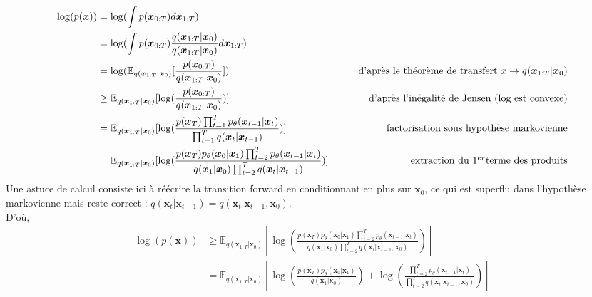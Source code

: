 \documentclass{article}
\begin{document}
\begin{align*}
\log(p(\boldsymbol{x})) &= \log(\int{p(\boldsymbol{x}_{0:T})d\boldsymbol{x}_{1:T}}) \\
&= \log(\int{p(\boldsymbol{x}_{0:T}) \frac{q(\boldsymbol{x}_{1:T}|\boldsymbol{x}_{0})}{q(\boldsymbol{x}_{1:T}|\boldsymbol{x}_{0})} d\boldsymbol{x}_{1:T}}) \\
&= \log(\mathbb{E}_{q(\boldsymbol{x}_{1:T}|\boldsymbol{x}_{0})}[\frac{p(\boldsymbol{x}_{0:T})}{q(\boldsymbol{x}_{1:T}|\boldsymbol{x}_{0})}]) & \tag*{d'après le théorème de transfert $x \rightarrow q(\boldsymbol{x}_{1:T}|\boldsymbol{x}_{0})$}\\
&\geq \mathbb{E}_{q(\boldsymbol{x}_{1:T}|\boldsymbol{x}_{0})}[\log(\frac{p(\boldsymbol{x}_{0:T})}{q(\boldsymbol{x}_{1:T}|\boldsymbol{x}_{0})})] & \tag*{d'après l'inégalité de Jensen (log est convexe)}\\
&= \mathbb{E}_{q(\boldsymbol{x}_{1:T}|\boldsymbol{x}_{0})}[\log(\frac{p(\boldsymbol{x}_T) \prod_{t=1}^T p_{\theta}(\boldsymbol{x}_{t-1}|\boldsymbol{x}_t)}{\prod_{t=1}^T q(\boldsymbol{x}_t|\boldsymbol{x}_{t-1})})] &\tag*{factorisation sous hypothèse markovienne} \\
&= \mathbb{E}_{q(\boldsymbol{x}_{1:T}|\boldsymbol{x}_{0})}[\log(\frac{p(\boldsymbol{x}_T)p_{\theta}(\boldsymbol{x}_0|\boldsymbol{x}_1) \prod_{t=2}^T p_{\theta}(\boldsymbol{x}_{t-1}|\boldsymbol{x}_t)}{q(\boldsymbol{x}_1|\boldsymbol{x}_0) \prod_{t=2}^{T} q(\boldsymbol{x}_t|\boldsymbol{x}_{t-1})})] & \tag*{extraction du 1$^{er}$terme des produits}
\end{align*}
Une astuce de calcul consiste ici à réécrire la transition forward en conditionnant en plus sur $\boldsymbol{x}_0$, ce qui est superflu dans l'hypothèse markovienne mais reste correct : $ q(\boldsymbol{x}_t|\boldsymbol{x}_{t-1}) = q(\boldsymbol{x}_t|\boldsymbol{x}_{t-1}, \boldsymbol{x}_0)$.\\
D'où, 
\begin{align*}
\log(p(\boldsymbol{x})) &\geq \mathbb{E}_{q(\boldsymbol{x}_{1:T}|\boldsymbol{x}_{0})}[\log(\frac{p(\boldsymbol{x}_T)p_{\theta}(\boldsymbol{x}_0|\boldsymbol{x}_1) \prod_{t=2}^T p_{\theta}(\boldsymbol{x}_{t-1}|\boldsymbol{x}_t)}{q(\boldsymbol{x}_1|\boldsymbol{x}_0) \prod_{t=2}^{T} q(\boldsymbol{x}_t|\boldsymbol{x}_{t-1}, \boldsymbol{x}_0)})] \\
&= \mathbb{E}_{q(\boldsymbol{x}_{1:T}|\boldsymbol{x}_0)}[\log(\frac{p(\boldsymbol{x}_T)p_{\theta}(\boldsymbol{x}_0|\boldsymbol{x}_1)}{q(\boldsymbol{x}_1|\boldsymbol{x}_0)}) + \log(\frac{\prod_{t=2}^T p_{\theta}(\boldsymbol{x}_{t-1}|\boldsymbol{x}_t)}{\prod_{t=2}^{T} q(\boldsymbol{x}_t|\boldsymbol{x}_{t-1}, \boldsymbol{x}_0)})]
\end{align*}
\end{document}
